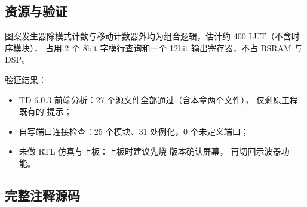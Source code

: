 \subsection{资源与验证}

图案发生器除模式计数与移动计数器外均为组合逻辑，估计约 400 LUT（不含时序模块），
占用 2 个 8bit 字模行查询和一个 12bit 输出寄存器，不占 BSRAM 与 DSP。

验证结果：

\begin{itemize}[leftmargin=2em,itemsep=1pt]
  \item TD 6.0.3 前端分析：27 个源文件全部通过（含本章两个文件），
        仅剩原工程既有的  提示；
  \item 自写端口连接检查：25 个模块、31 处例化，0 个未定义端口；
  \item 未做 RTL 仿真与上板：上板时建议先烧  版本确认屏幕，
        再切回示波器功能。
\end{itemize}

\subsection{完整注释源码}




